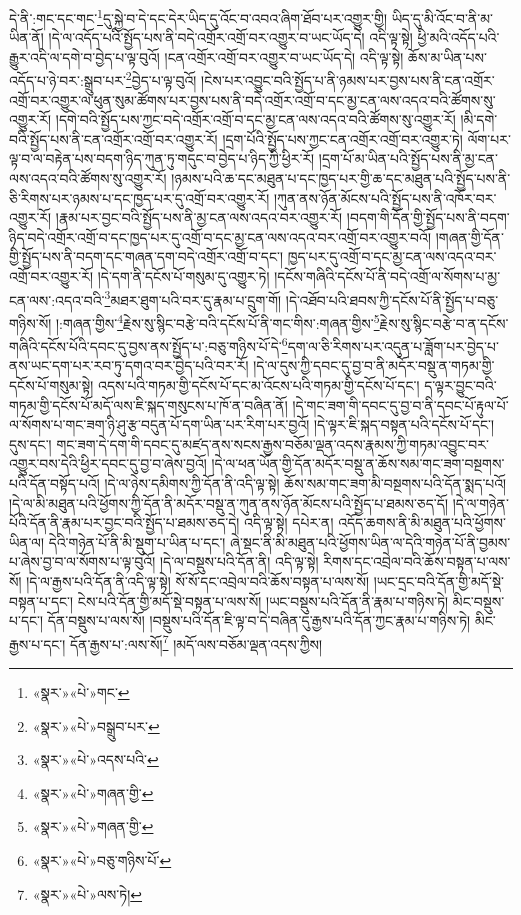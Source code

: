 དེ་ནི་:གང་དང་གང་\footnote{«སྣར་»«པེ་»གང་}དུ་སྐྱེ་བ་དེ་དང་དེར་ཡིད་དུ་འོང་བ་འབའ་ཞིག་ཐོབ་པར་འགྱུར་གྱི། ཡིད་དུ་མི་འོང་བ་ནི་མ་ཡིན་ནོ། །དེ་ལ་འདོད་པའི་སྤྱོད་པས་ནི་བདེ་འགྲོར་འགྲོ་བར་འགྱུར་བ་ཡང་ཡོད་དེ། འདི་ལྟ་སྟེ། ཕྱི་མའི་འདོད་པའི་རྒྱུར་འདི་ལ་དགེ་བ་བྱེད་པ་ལྟ་བུའོ། །ངན་འགྲོར་འགྲོ་བར་འགྱུར་བ་ཡང་ཡོད་དེ། འདི་ལྟ་སྟེ། ཆོས་མ་ཡིན་པས་འདོད་པ་ཉེ་བར་:སྒྲུབ་པར་\footnote{«སྣར་»«པེ་»བསྒྲུབ་པར་}བྱེད་པ་ལྟ་བུའོ། །ངེས་པར་འབྱུང་བའི་སྤྱོད་པ་ནི་ཉམས་པར་བྱས་པས་ནི་ངན་འགྲོར་འགྲོ་བར་འགྱུར་ལ་ཕུན་སུམ་ཚོགས་པར་བྱས་པས་ནི་བདེ་འགྲོར་འགྲོ་བ་དང་མྱ་ངན་ལས་འདའ་བའི་ཚོགས་སུ་འགྱུར་རོ། །དགེ་བའི་སྤྱོད་པས་ཀྱང་བདེ་འགྲོར་འགྲོ་བ་དང་མྱ་ངན་ལས་འདའ་བའི་ཚོགས་སུ་འགྱུར་རོ། །མི་དགེ་བའི་སྤྱོད་པས་ནི་ངན་འགྲོར་འགྲོ་བར་འགྱུར་རོ། །དྲག་པོའི་སྤྱོད་པས་ཀྱང་ངན་འགྲོར་འགྲོ་བར་འགྱུར་ཏེ། ལོག་པར་ལྟ་བ་ལ་བརྟེན་པས་བདག་ཉིད་ཀུན་ཏུ་གདུང་བ་བྱེད་པ་ཉིད་ཀྱི་ཕྱིར་རོ། །དྲག་པོ་མ་ཡིན་པའི་སྤྱོད་པས་ནི་མྱ་ངན་ལས་འདའ་བའི་ཚོགས་སུ་འགྱུར་རོ། །ཉམས་པའི་ཆ་དང་མཐུན་པ་དང་ཁྱད་པར་གྱི་ཆ་དང་མཐུན་པའི་སྤྱོད་པས་ནི་ཅི་རིགས་པར་ཉམས་པ་དང་ཁྱད་པར་དུ་འགྲོ་བར་འགྱུར་རོ། །ཀུན་ནས་ཉོན་མོངས་པའི་སྤྱོད་པས་ནི་འཁོར་བར་འགྱུར་རོ། །རྣམ་པར་བྱང་བའི་སྤྱོད་པས་ནི་མྱ་ངན་ལས་འདའ་བར་འགྱུར་རོ། །བདག་གི་དོན་གྱི་སྤྱོད་པས་ནི་བདག་ཉིད་བདེ་འགྲོར་འགྲོ་བ་དང་ཁྱད་པར་དུ་འགྲོ་བ་དང་མྱ་ངན་ལས་འདའ་བར་འགྲོ་བར་འགྱུར་བའོ། །གཞན་གྱི་དོན་གྱི་སྤྱོད་པས་ནི་བདག་དང་གཞན་དག་བདེ་འགྲོར་འགྲོ་བ་དང་། ཁྱད་པར་དུ་འགྲོ་བ་དང་མྱ་ངན་ལས་འདའ་བར་འགྲོ་བར་འགྱུར་རོ། །དེ་དག་ནི་དངོས་པོ་གསུམ་དུ་འགྱུར་ཏེ། །དངོས་གཞིའི་དངོས་པོ་ནི་བདེ་འགྲོ་ལ་སོགས་པ་མྱ་ངན་ལས་:འདའ་བའི་\footnote{«སྣར་»«པེ་»འདས་པའི་}མཐར་ཐུག་པའི་བར་དུ་རྣམ་པ་དྲུག་གོ། །དེ་འཐོབ་པའི་ཐབས་ཀྱི་དངོས་པོ་ནི་སྤྱོད་པ་བཅུ་གཉིས་སོ། །:གཞན་གྱིས་\footnote{«སྣར་»«པེ་»གཞན་གྱི་}རྗེས་སུ་སྙིང་བརྩེ་བའི་དངོས་པོ་ནི་གང་གིས་:གཞན་གྱིས་\footnote{«སྣར་»«པེ་»གཞན་གྱི་}རྗེས་སུ་སྙིང་བརྩེ་བ་ན་དངོས་གཞིའི་དངོས་པོའི་དབང་དུ་བྱས་ནས་སྤྱོད་པ་:བཅུ་གཉིས་པོ་དེ་\footnote{«སྣར་»«པེ་»བཅུ་གཉིས་པོ་}དག་ལ་ཅི་རིགས་པར་འདུན་པ་ཟློག་པར་བྱེད་པ་ནས་ཡང་དག་པར་རབ་ཏུ་དགའ་བར་བྱེད་པའི་བར་རོ། །དེ་ལ་དུས་ཀྱི་དབང་དུ་བྱ་བ་ནི་མདོར་བསྡུ་ན་གཏམ་གྱི་དངོས་པོ་གསུམ་སྟེ། འདས་པའི་གཏམ་གྱི་དངོས་པོ་དང་མ་འོངས་པའི་གཏམ་གྱི་དངོས་པོ་དང་། ད་ལྟར་བྱུང་བའི་གཏམ་གྱི་དངོས་པོ་མདོ་ལས་ཇི་སྐད་གསུངས་པ་ཁོ་ན་བཞིན་ནོ། །དེ་གང་ཟག་གི་དབང་དུ་བྱ་བ་ནི་དབང་པོ་རྟུལ་པོ་ལ་སོགས་པ་གང་ཟག་ཉི་ཤུ་རྩ་བདུན་པོ་དག་ཡིན་པར་རིག་པར་བྱའོ། །དེ་ལྟར་ཇི་སྐད་བསྟན་པའི་དངོས་པོ་དང་། དུས་དང་། གང་ཟག་དེ་དག་གི་དབང་དུ་མཛད་ནས་སངས་རྒྱས་བཅོམ་ལྡན་འདས་རྣམས་ཀྱི་གཏམ་འབྱུང་བར་འགྱུར་བས་དེའི་ཕྱིར་དབང་དུ་བྱ་བ་ཞེས་བྱའོ། །དེ་ལ་ཕན་ཡོན་གྱི་དོན་མདོར་བསྡུ་ན་ཆོས་སམ་གང་ཟག་བསྔགས་པའི་དོན་བསྟོད་པའོ། །དེ་ལ་ཉེས་དམིགས་ཀྱི་དོན་ནི་འདི་ལྟ་སྟེ། ཆོས་སམ་གང་ཟག་མི་བསྔགས་པའི་དོན་སྨད་པའོ། །དེ་ལ་མི་མཐུན་པའི་ཕྱོགས་ཀྱི་དོན་ནི་མདོར་བསྡུ་ན་ཀུན་ནས་ཉོན་མོངས་པའི་སྤྱོད་པ་ཐམས་ཅད་དོ། །དེ་ལ་གཉེན་པོའི་དོན་ནི་རྣམ་པར་བྱང་བའི་སྤྱོད་པ་ཐམས་ཅད་དེ། འདི་ལྟ་སྟེ། དཔེར་ན། འདོད་ཆགས་ནི་མི་མཐུན་པའི་ཕྱོགས་ཡིན་ལ། དེའི་གཉེན་པོ་ནི་མི་སྡུག་པ་ཡིན་པ་དང་། ཞེ་སྡང་ནི་མི་མཐུན་པའི་ཕྱོགས་ཡིན་ལ་དེའི་གཉེན་པོ་ནི་བྱམས་པ་ཞེས་བྱ་བ་ལ་སོགས་པ་ལྟ་བུའོ། །དེ་ལ་བསྡུས་པའི་དོན་ནི། འདི་ལྟ་སྟེ། རིགས་དང་འབྲེལ་བའི་ཆོས་བསྟན་པ་ལས་སོ། །དེ་ལ་རྒྱས་པའི་དོན་ནི་འདི་ལྟ་སྟེ། སོ་སོ་དང་འབྲེལ་བའི་ཆོས་བསྟན་པ་ལས་སོ། །ཡང་དྲང་བའི་དོན་གྱི་མདོ་སྡེ་བསྟན་པ་དང་། ངེས་པའི་དོན་གྱི་མདོ་སྡེ་བསྟན་པ་ལས་སོ། །ཡང་བསྡུས་པའི་དོན་ནི་རྣམ་པ་གཉིས་ཏེ། མིང་བསྡུས་པ་དང་། དོན་བསྡུས་པ་ལས་སོ། །བསྡུས་པའི་དོན་ཇི་ལྟ་བ་དེ་བཞིན་དུ་རྒྱས་པའི་དོན་ཀྱང་རྣམ་པ་གཉིས་ཏེ། མིང་རྒྱས་པ་དང་། དོན་རྒྱས་པ་:ལས་སོ།\footnote{«སྣར་»«པེ་»ལས་ཏེ།} །མདོ་ལས་བཅོམ་ལྡན་འདས་ཀྱིས། 